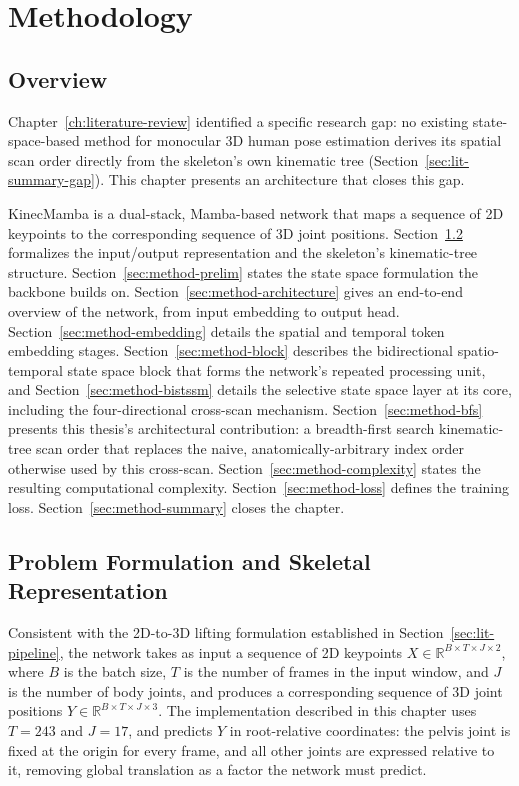 \setlength{\footskip}{8mm}

\chapter{Methodology}
\label{ch:methodology}

\section{Overview}
\label{sec:method-overview}

Chapter~\ref{ch:literature-review} identified a specific research gap: no
existing state-space-based method for monocular 3D human pose estimation
derives its spatial scan order directly from the
skeleton's own kinematic tree (Section~\ref{sec:lit-summary-gap}). This
chapter presents an architecture that closes this gap.

KinecMamba is a dual-stack, Mamba-based network that maps a
sequence of 2D keypoints to the corresponding sequence of 3D joint
positions. Section~\ref{sec:method-problem} formalizes the input/output
representation and the skeleton's kinematic-tree structure.
Section~\ref{sec:method-prelim} states the state space formulation the
backbone builds on.
Section~\ref{sec:method-architecture} gives an end-to-end overview of the
network, from input embedding to output head.
Section~\ref{sec:method-embedding} details the spatial and temporal token
embedding stages. Section~\ref{sec:method-block} describes the
bidirectional spatio-temporal state space block that forms the network's
repeated processing unit, and Section~\ref{sec:method-bistssm} details the
selective state space layer at its core, including the four-directional
cross-scan mechanism. Section~\ref{sec:method-bfs} presents this thesis's
architectural contribution: a breadth-first search kinematic-tree scan
order that replaces the naive, anatomically-arbitrary index order
otherwise used by this cross-scan.
Section~\ref{sec:method-complexity} states the resulting computational
complexity. Section~\ref{sec:method-loss} defines
the training loss. Section~\ref{sec:method-summary} closes the chapter.

\section{Problem Formulation and Skeletal Representation}
\label{sec:method-problem}

Consistent with the 2D-to-3D lifting formulation established in
Section~\ref{sec:lit-pipeline}, the network takes as input a sequence of
2D keypoints $X \in \mathbb{R}^{B \times T \times J \times 2}$, where $B$
is the batch size, $T$ is the number of frames in the input window, and
$J$ is the number of body joints, and produces a corresponding sequence of
3D joint positions $Y \in \mathbb{R}^{B \times T \times J \times 3}$. The
implementation described in this chapter uses $T=243$ and $J=17$, and
predicts $Y$ in root-relative coordinates: the pelvis joint is fixed at
the origin for every frame, and all other joints are expressed relative to
it, removing global translation as a factor the network must predict.

